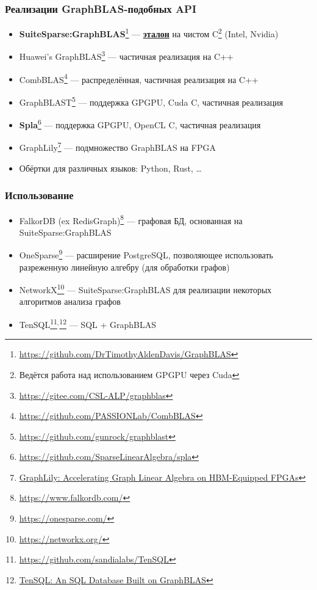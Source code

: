 \documentclass[xcolor=table,aspectratio=169]{beamer}
\begin{document}
\begin{frame}[fragile]
  \frametitle{Реализации GraphBLAS-подобных API}
  \begin{itemize}
      \item \textbf{SuiteSparse:GraphBLAS}\footnote{\url{https://github.com/DrTimothyAldenDavis/GraphBLAS}} --- \underline{\textbf{эталон}} на чистом C\footnote{Ведётся работа над использованием GPGPU через Cuda} (Intel, Nvidia)
      \item Huawei's GraphBLAS\footnote{\url{https://gitee.com/CSL-ALP/graphblas}} --- частичная реализация на C++
      \item CombBLAS\footnote{\url{https://github.com/PASSIONLab/CombBLAS}} --- распределённая, частичная реализация на C++
      \item GraphBLAST\footnote{\url{https://github.com/gunrock/graphblast}} --- поддержка GPGPU, Cuda C, частичная реализация
      \item[\color{red}\textbullet] \textbf{Spla}\footnote{\url{https://github.com/SparseLinearAlgebra/spla}} --- поддержка GPGPU, OpenCL C, частичная реализация
      \item GraphLily\footnote{\href{https://dl.acm.org/doi/10.1109/ICCAD51958.2021.9643582}{GraphLily: Accelerating Graph Linear Algebra on HBM-Equipped FPGAs}} --- подмножество GraphBLAS на FPGA
      \item Обёртки для различных языков: Python, Rust, \ldots
  \end{itemize}
\end{frame}

\begin{frame}[fragile]
  \frametitle{Использование}
      \begin{itemize}
        \item FalkorDB (ex RedisGraph)\footnote{\url{https://www.falkordb.com/}} --- графовая БД, основанная на SuiteSparse:GraphBLAS
        \item OneSparse\footnote{\url{https://onesparse.com/}} --- расширение PostgreSQL, позволяющее использовать разреженную линейную алгебру (для обработки графов)
        \item NetworkX\footnote{\url{https://networkx.org/}} --- SuiteSparse:GraphBLAS для реализации некоторых алгоритмов анализа графов
        \item TenSQL\footnote{\url{https://github.com/sandialabs/TenSQL}}$^{,}$\footnote{\href{https://ieeexplore.ieee.org/document/10363601}{TenSQL: An SQL Database Built on GraphBLAS}} --- SQL + GraphBLAS
      \end{itemize}  
\end{frame}
\end{document}
